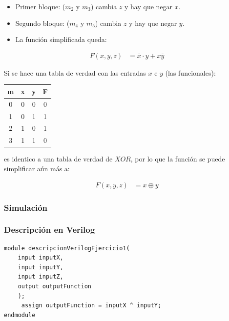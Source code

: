 \begin{itemize}[nosep] \item Primer bloque: ($m_2$ y $m_3$) cambia $z$ y hay que negar $x$.
\item Segundo bloque: ($m_4$ y $m_5$) cambia $z$ y hay que negar $y$.
\item La función simplificada queda:\end{itemize}
    {\large\begin{align*}
    F(x,y,z) &= \overline{x}\cdot y + x\overline{y}
\end{align*}}

\noindent Si se hace una tabla de verdad con las entradas $x$ e $y$ (las funcionales):

\begin{center}
\begin{tabular}{c|cc|c}
\rowcolor[HTML]{FFCCC9} 
\cellcolor[HTML]{9AFF99}m & x & y & \cellcolor[HTML]{FFFC9E}F \\ \hline
0                         & 0 & 0 & 0                         \\
1                         & 0 & 1 & 1                         \\
2                         & 1 & 0 & 1                         \\
3                         & 1 & 1 & 0                        
\end{tabular}


\end{center}

\noindent es identico a una tabla de verdad de $XOR$, por lo que la función se puede simplificar aún más a:

{\large\begin{align*} F(x,y,z) &= x\oplus y\end{align*}}
\subsubsection{Simulación}


\subsubsection{Descripción en Verilog}
\begin{lstlisting}
module descripcionVerilogEjercicio1(
    input inputX,
    input inputY,
    input inputZ,
    output outputFunction
    );
	 assign outputFunction = inputX ^ inputY;
endmodule
\end{lstlisting}
